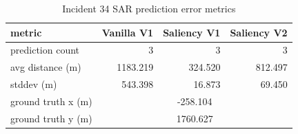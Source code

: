 \begin{table}[ht]
\centering
\caption{Incident 34 SAR prediction error metrics}
\label{tab:sar-incident-34}
\begin{tabular}{lrrr}
\hline
metric & Vanilla V1 & Saliency V1 & Saliency V2 \\
\hline
prediction count & 3 & 3 & 3 \\
avg distance (m) & 1183.219 & 324.520 & 812.497 \\
stddev (m) & 543.398 & 16.873 & 69.450 \\
ground truth x (m) & \multicolumn{3}{c}{-258.104} \\
ground truth y (m) & \multicolumn{3}{c}{1760.627} \\
\hline
\end{tabular}
\end{table}
